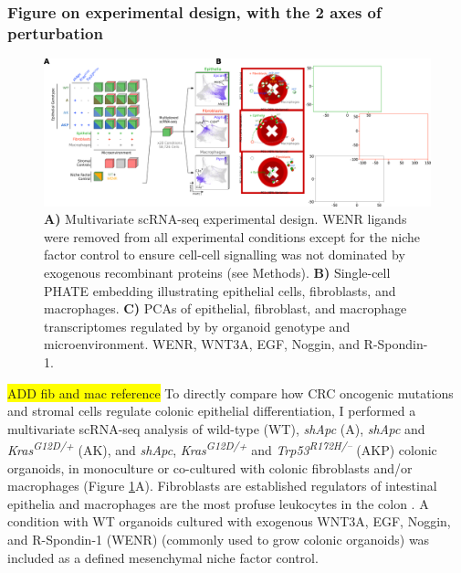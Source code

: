 \subsubsection{Figure on experimental design, with the 2 axes of perturbation}

\begin{figure}
    \centering
    \includegraphics{04seq/figs/4SEQ_ExpDesign.png}
    \caption{\textbf{A)} Multivariate scRNA-seq experimental design. WENR ligands were removed from all experimental conditions except for the niche factor control to ensure cell-cell signalling was not dominated by exogenous recombinant proteins (see Methods). \textbf{B)} Single-cell PHATE embedding illustrating epithelial cells, fibroblasts, and macrophages. \textbf{C)} PCAs of epithelial, fibroblast, and macrophage transcriptomes regulated by by organoid genotype and microenvironment. WENR, WNT3A, EGF, Noggin, and R-Spondin-1.}
    \label{fig:4exp}
\end{figure}

\colorbox{yellow}{ADD fib and mac reference}
To directly compare how CRC oncogenic mutations and stromal cells regulate colonic epithelial differentiation, I performed a multivariate scRNA-seq analysis of wild-type (WT), \textit{shApc} (A), \textit{shApc} and \textit{Kras\textsuperscript{G12D/+}} (AK), and \textit{shApc}, \textit{Kras\textsuperscript{G12D/+}} and \textit{Trp53\textsuperscript{R172H/–}} (AKP) colonic organoids, in monoculture or co-cultured with colonic fibroblasts and/or macrophages (Figure \ref{fig:4exp}A). Fibroblasts are established regulators of intestinal epithelia \cite{roulis_fibroblasts_2016} and macrophages are the most profuse leukocytes in the colon \cite{isidro_colonic_2016}. A condition with WT organoids cultured with exogenous WNT3A, EGF, Noggin, and R-Spondin-1 (WENR) (commonly used to grow colonic organoids) was included as a defined mesenchymal niche factor control. 


